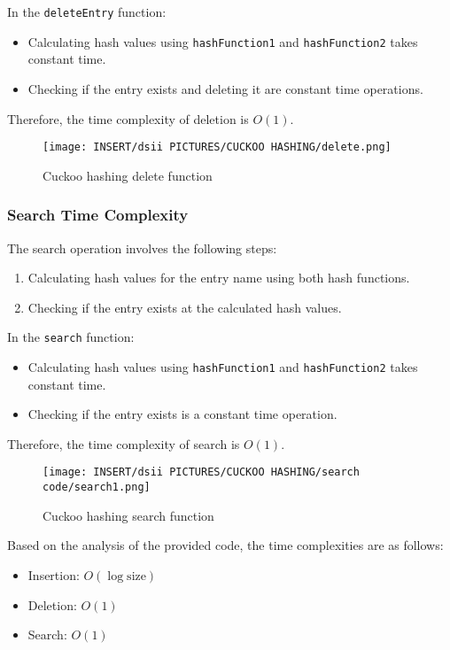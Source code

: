 \documentclass[12pt]{article}
\begin{document}
In the \texttt{deleteEntry} function:
\begin{itemize}
    \item Calculating hash values using \texttt{hashFunction1} and \texttt{hashFunction2} takes constant time.
    \item Checking if the entry exists and deleting it are constant time operations.
\end{itemize}

Therefore, the time complexity of deletion is $O(1)$.
\begin{figure}[htbp]
    \centering
    \texttt{[image: INSERT/dsii PICTURES/CUCKOO HASHING/delete.png]}
    \caption{Cuckoo hashing delete function}
    \label{fig:deletion}
\end{figure}

\newpage

\subsubsection{Search Time Complexity}

The search operation involves the following steps:
\begin{enumerate}
    \item Calculating hash values for the entry name using both hash functions.
    \item Checking if the entry exists at the calculated hash values.
\end{enumerate}

In the \texttt{search} function:
\begin{itemize}
    \item Calculating hash values using \texttt{hashFunction1} and \texttt{hashFunction2} takes constant time.
    \item Checking if the entry exists is a constant time operation.
\end{itemize}

Therefore, the time complexity of search is $O(1)$.
\begin{figure}[htbp]
    \centering
    \texttt{[image: INSERT/dsii PICTURES/CUCKOO HASHING/search code/search1.png]}
    \caption{Cuckoo hashing search function}
    \label{fig:insertion_step1}
\end{figure}

\newpage

Based on the analysis of the provided code, the time complexities are as follows:
\begin{itemize}
    \item Insertion: $O(\log \text{{size}})$
    \item Deletion: $O(1)$
    \item Search: $O(1)$
\end{itemize}
\end{document}
